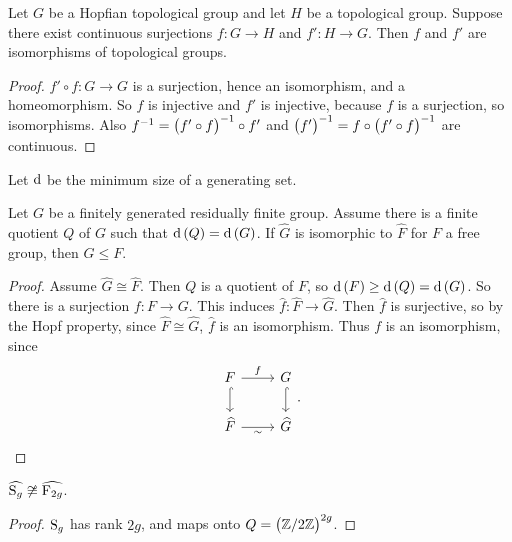 \begin{proposition}
Let $ G $ be a Hopfian topological group and let $ H $ be a topological group. Suppose there exist continuous surjections $ f : G \to H $ and $ f' : H \to G $. Then $ f $ and $ f' $ are isomorphisms of topological groups.
\end{proposition}

\begin{proof}
$ f' \circ f : G \to G $ is a surjection, hence an isomorphism, and a homeomorphism. So $ f $ is injective and $ f' $ is injective, because $ f $ is a surjection, so isomorphisms. Also $ f^{-1} = \br{f' \circ f}^{-1} \circ f' $ and $ \br{f'}^{-1} = f \circ \br{f' \circ f}^{-1} $ are continuous.
\end{proof}

\pagebreak

Let $ \d $ be the minimum size of a generating set.

\begin{proposition}
Let $ G $ be a finitely generated residually finite group. Assume there is a finite quotient $ Q $ of $ G $ such that $ \d\br{Q} = \d\br{G} $. If $ \widehat{G} $ is isomorphic to $ \widehat{F} $ for $ F $ a free group, then $ G \le F $.
\end{proposition}

\begin{proof}
Assume $ \widehat{G} \cong \widehat{F} $. Then $ Q $ is a quotient of $ F $, so $ \d\br{F} \ge \d\br{Q} = \d\br{G} $. So there is a surjection $ f : F \to G $. This induces $ \widehat{f} : \widehat{F} \to \widehat{G} $. Then $ \widehat{f} $ is surjective, so by the Hopf property, since $ \widehat{F} \cong \widehat{G} $, $ \widehat{f} $ is an isomorphism. Thus $ f $ is an isomorphism, since
$$
\begin{tikzcd}
F \arrow{r}{f} \arrow[hookrightarrow]{d} & G \arrow[hookrightarrow]{d} \\
\widehat{F} \arrow{r}[swap]{\sim} & \widehat{G}
\end{tikzcd}.
$$
\end{proof}

\begin{corollary}
$ \widehat{\S_g} \not\cong \widehat{\F_{2g}} $.
\end{corollary}

\begin{proof}
$ \S_g $ has rank $ 2g $, and maps onto $ Q = \br{\ZZ / 2\ZZ}^{2g} $.
\end{proof}

